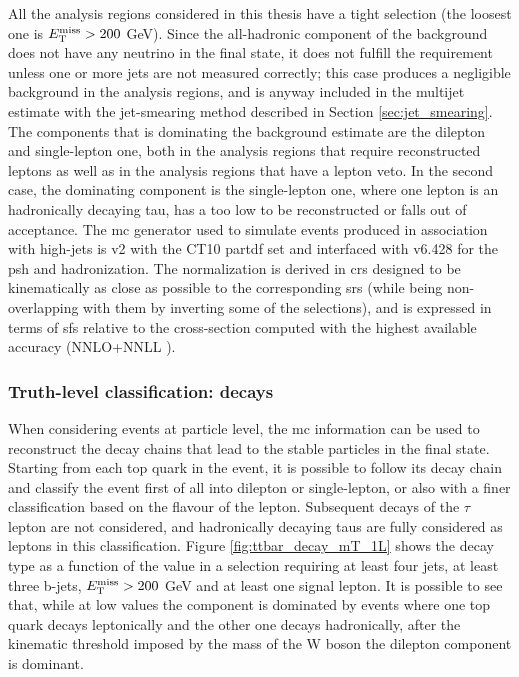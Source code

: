 All the analysis regions considered in this thesis have a tight \met selection (the loosest one is $E_{\rm T}^{\mathrm{miss}} > 200$ GeV). Since the all-hadronic component 
of the \ttbar background does not have any neutrino in the final state, it does not fulfill the \met requirement unless one or more jets are not measured correctly; this case produces a negligible background in the analysis regions, and is anyway included in the multijet estimate with the jet-smearing method described in Section \ref{sec:jet_smearing}.
The \ttbar components that is dominating the background estimate are the dilepton and single-lepton one, both in the analysis regions that require reconstructed leptons as well as in the analysis regions that have a lepton veto.
In the second case, the dominating component is the single-lepton one, where one lepton is an hadronically decaying tau, has a \pt too low to be reconstructed or falls out of acceptance. 
The \gls{mc} generator used to simulate \ttbar events produced in association with high-\pt jets is \PowhegBox v2 with the CT10 \gls{partdf} set \cite{Lai:2010vv} and interfaced with \PY v6.428 \cite{Sjostrand:2006za} for the \gls{psh} and hadronization. 
The normalization is derived in \glspl{cr} designed to be kinematically as close as possible to the corresponding \glspl{sr} (while being non-overlapping with them by inverting some of the selections), and is expressed in terms of \glspl{sf} relative to the cross-section computed with the highest
available accuracy (NNLO+NNLL \cite{Czakon:2011xx}).

\subsubsection*{Truth-level classification: \ttbar decays}

When considering events at particle level,
the \gls{mc} information can be used to reconstruct the decay chains that lead to the stable particles in the final state. 
Starting from each top quark in the event, it is possible to follow its decay chain and classify the event first of all into dilepton or single-lepton, or also with a finer classification based on the flavour of the lepton. 
Subsequent decays of the $\tau$ lepton are not considered, and hadronically decaying taus are fully considered as leptons in this classification. 
Figure \ref{fig:ttbar_decay_mT_1L} shows the \ttbar decay type as a function of the \mt value  in a selection requiring at least four jets, at least three b-jets, $E_{\rm T}^{\mathrm{miss}}>200$ GeV and at least one signal lepton. It is possible to see that, while at low \mt values the \ttbar component is dominated by events where one top quark decays leptonically and the other one decays hadronically, after the kinematic threshold imposed by the mass of the W boson the dilepton component is dominant. 


